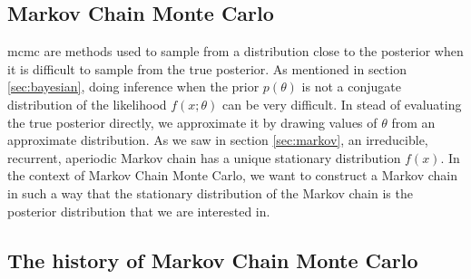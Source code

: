 \documentclass{article}
\theoremstyle{definition}
\begin{document}
\subsection{Markov Chain Monte Carlo}
\gls{mcmc} are  methods used to sample from a distribution close to the posterior when it is difficult to sample from the true posterior. As mentioned in section \ref{sec:bayesian}, 
doing inference when the prior $p\left(\theta\right)$ is not a conjugate distribution of the likelihood $f\left(x ; \theta\right)$ can be very difficult. In stead of evaluating the true posterior directly, we approximate it by drawing values of $\theta$ from an approximate distribution. As we saw in  section \ref{sec:markov}, an irreducible, recurrent, aperiodic Markov chain has a unique stationary distribution $f(x)$. In the context of Markov Chain Monte Carlo, we want to construct a Markov chain in such a way that the stationary distribution of the Markov chain is the posterior distribution that we are interested in.
\subsection{The history of Markov Chain Monte Carlo}
\end{document}
